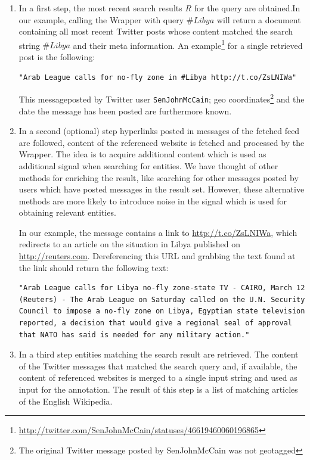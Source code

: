 \documentclass{llncs}
\begin{document}
\begin{enumerate}
	\item In a first step, the most recent search results $R$ for the query are
	obtained.\newline In our example, calling the Wrapper with query $\#Libya$ will
	return a document containing all most recent Twitter posts whose content
	matched the search string $\#Libya$ and their meta information. 
	\newline
	An example\footnote{\url{http://twitter.com/SenJohnMcCain/statuses/46619460060196865}}
for a single retrieved post is the following:
{\small
\begin{verbatim}
"Arab League calls for no-fly zone in #Libya http://t.co/ZsLNIWa"
\end{verbatim}}
This messageposted by Twitter user \texttt{SenJohnMcCain}; geo coordinates\footnote{The original Twitter message posted by SenJohnMcCain was not geotagged} and the date the message has been posted are furthermore known.
  
  \item In a second (optional) step hyperlinks posted in messages of the fetched
  feed are followed, content of the referenced website is fetched and processed by the Wrapper. The idea is to acquire additional content which is used as additional signal when searching for entities. We have thought of other methods for enriching the result, like searching for other messages posted by users which have posted messages in the result set. However, these alternative methods are more likely to introduce noise in the signal which is used for obtaining relevant entities.
  
In our example, the message contains a link to
\url{http://t.co/ZsLNIWa}, which redirects to an article on the situation in
Libya published on \url{http://reuters.com}. Dereferencing this URL and grabbing
the text found at the link should return the following text:
{\small\begin{verbatim}"Arab League calls for Libya no-fly zone-state TV - CAIRO, March 12
(Reuters) - The Arab League on Saturday called on the U.N. Security 
Council to impose a no-fly zone on Libya, Egyptian state television
reported, a decision that would give a regional seal of approval
that NATO has said is needed for any military action."\end{verbatim}}
	\item In a third step entities matching the search result are retrieved. The
	content of the Twitter messages that matched the search query and, if available, the content of referenced websites is merged to a single input string and used as input for the annotation. The result of this step is a list of matching articles of the English Wikipedia.


\end{enumerate}
\end{document}
